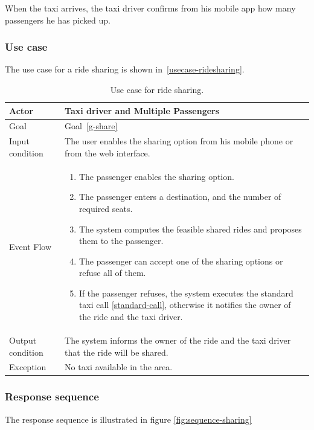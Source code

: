 When the taxi arrives, the taxi driver confirms from his mobile app how many passengers he has picked up.

\subsubsection{Use case}
The use case for a ride sharing is shown in~\autoref{usecase-ridesharing}.

\begin{table}
\begin{center}
\begin{tabular}{| l | p{} |}
\hline
Actor & Taxi driver and Multiple Passengers \\
\hline
Goal & Goal~\ref{g-share}
\\
\hline
Input condition & The user enables the sharing option from his mobile phone or from the web interface.  \\
\hline
Event Flow &
\begin{enumerate}
	\item The passenger enables the sharing option.
	\item The passenger enters a destination, and the number of required seats.
	\item The system computes the feasible shared rides and proposes them to the passenger.
	\item The passenger can accept one of the sharing options or refuse all of them.
	\item If the passenger refuses, the system executes the standard taxi call \ref{standard-call}, otherwise it notifies the owner of the ride and the taxi driver.
\end{enumerate}
\\
\hline
Output condition & The system informs the owner of the ride and the taxi driver that the ride will be shared. \\
\hline
Exception & No taxi available in the area. \\
\hline
\end{tabular}
\end{center}
\caption{Use case for ride sharing.}
\label{usecase-ridesharing}
\end{table}

\subsubsection{Response sequence}
The response sequence is illustrated in figure \ref{fig:sequence-sharing}

